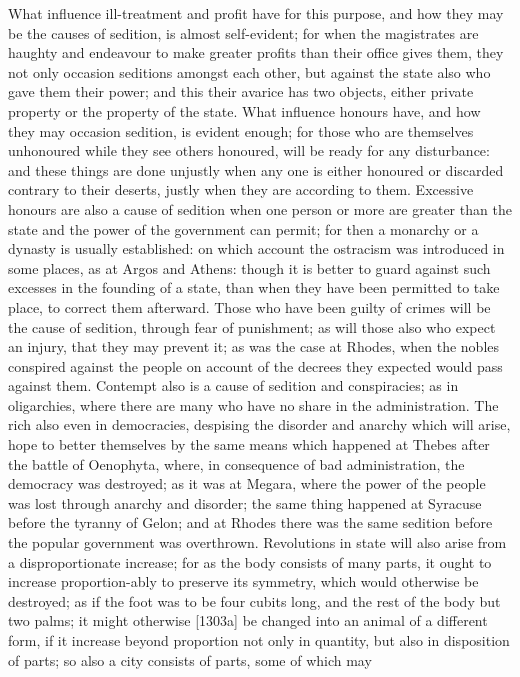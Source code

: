 What influence ill-treatment and profit have for this purpose, and how
they may be the causes of sedition, is almost self-evident; for when the
magistrates are haughty and endeavour to make greater profits than their
office gives them, they not only occasion seditions amongst each other,
but against the state also who gave them their power; and this their
avarice has two objects, either private property or the property of the
state. What influence honours have, and how they may occasion sedition, is
evident enough; for those who are themselves unhonoured while they see
others honoured, will be ready for any disturbance: and these things are
done unjustly when any one is either honoured or discarded contrary to
their deserts, justly when they are according to them. Excessive honours
are also a cause of sedition when one person or more are greater than the
state and the power of the government can permit; for then a monarchy or a
dynasty is usually established: on which account the ostracism was
introduced in some places, as at Argos and Athens: though it is better to
guard against such excesses in the founding of a state, than when they
have been permitted to take place, to correct them afterward. Those who
have been guilty of crimes will be the cause of sedition, through fear of
punishment; as will those also who expect an injury, that they may prevent
it; as was the case at Rhodes, when the nobles conspired against the
people on account of the decrees they expected would pass against them.
Contempt also is a cause of sedition and conspiracies; as in oligarchies,
where there are many who have no share in the administration. The rich
also even in democracies, despising the disorder and anarchy which will
arise, hope to better themselves by the same means which happened at
Thebes after the battle of Oenophyta, where, in consequence of bad
administration, the democracy was destroyed; as it was at Megara, where
the power of the people was lost through anarchy and disorder; the same
thing happened at Syracuse before the tyranny of Gelon; and at Rhodes
there was the same sedition before the popular government was overthrown.
Revolutions in state will also arise from a disproportionate increase; for
as the body consists of many parts, it ought to increase proportion-ably
to preserve its symmetry, which would otherwise be destroyed; as if the
foot was to be four cubits long, and the rest of the body but two palms;
it might otherwise [1303a] be changed into an animal of a different form,
if it increase beyond proportion not only in quantity, but also in
disposition of parts; so also a city consists of parts, some of which may
